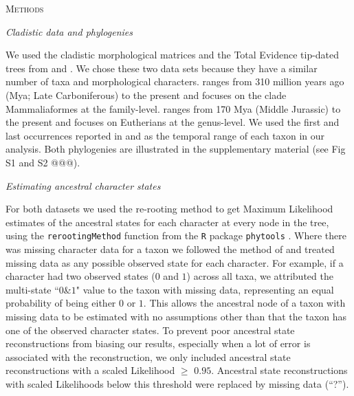 \documentclass[12pt,letterpaper]{article}
\renewcommand{\section}[1]{%
\bigskip
\begin{center}
\begin{Large}
\normalfont\scshape #1
\medskip
\end{Large}
\end{center}}
\renewcommand{\subsection}[1]{%
\bigskip
\begin{center}
\begin{large}
\normalfont\itshape #1
\end{large}
\end{center}}
\begin{document}
%
%

\section{Methods}

\subsection{Cladistic data and phylogenies}
We used the cladistic morphological matrices and the Total Evidence tip-dated trees \citep{ronquista2012} from \citet[][103 taxa with 446 morphological characters]{Slater2012MEE} and \citet[][102 taxa with 421 morphological characters]{beckancient2014}.
We chose these two data sets because they have a similar number of taxa and morphological characters.
\cite{Slater2012MEE} ranges from 310 million years ago (Mya; Late Carboniferous) to the present and focuses on the clade Mammaliaformes at the family-level.
\cite{beckancient2014} ranges from 170 Mya (Middle Jurassic) to the present and focuses on Eutherians at the genus-level.
We used the first and last occurrences reported in \cite{Slater2012MEE} and \cite{beckancient2014} as the temporal range of each taxon in our analysis.
Both phylogenies are illustrated in the supplementary material (see Fig S1 and S2 @@@).

\subsection{Estimating ancestral character states}
For both datasets we used the re-rooting method \citep{Yang01121995,Garland2000} to get Maximum Likelihood estimates of the ancestral states for each character at every node in the tree, using the \texttt{rerootingMethod} function from the \texttt{R} package \texttt{phytools} \citep[version 0.4-45;][]{phytools,R}.
Where there was missing character data for a taxon we followed the method of \cite{Claddis} and treated missing data as any possible observed state for each character.
For example, if a character had two observed states ($0$ and $1$) across all taxa, we attributed the multi-state ``$0$\&$1$" value to the taxon with missing data, representing an equal probability of being either $0$ or $1$.
This allows the ancestral node of a taxon with missing data to be estimated with no assumptions other than that the taxon has one of the observed character states.
To prevent poor ancestral state reconstructions from biasing our results, especially when a lot of error is associated with the reconstruction, we only included ancestral state reconstructions with a scaled Likelihood $\geq$ $0.95$.
Ancestral state reconstructions with scaled Likelihoods below this threshold were replaced by missing data (``?'').
\end{document}
